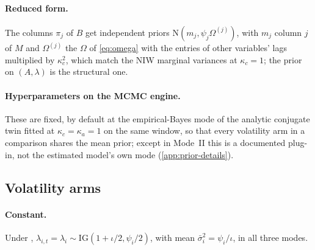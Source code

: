 \paragraph{Reduced form.} The columns $\pi_j$ of $B$ get independent priors
$\mathrm{N}(m_j, \psi_j\Omega^{(j)})$, with $m_j$ column $j$ of $M$ and $\Omega^{(j)}$ the $\Omega$ of
\eqref{eq:omega} with the entries of other variables' lags multiplied by $\kappa_c^2$, which match
the NIW marginal variances at $\kappa_c = 1$; the prior on $(A, \lambda)$ is the structural one. %

\paragraph{Hyperparameters on the MCMC engine.} These are fixed, by default at the empirical-Bayes
mode of the analytic conjugate twin fitted at $\kappa_c = \kappa_a = 1$ on the same window, so that
every volatility arm in a comparison shares the mean prior; except in Mode~II this is a documented
plug-in, not the estimated model's own mode (\cref{app:prior-details}). %

\subsection{Volatility arms}\label{sec:framework:vol}

\paragraph{Constant.} Under , $\lambda_{i,t} = \lambda_i \sim \mathrm{IG}(1 + \iota/2,
\psi_i/2)$, with mean $\bar\sigma_i^2 = \psi_i/\iota$, in all three modes. %

